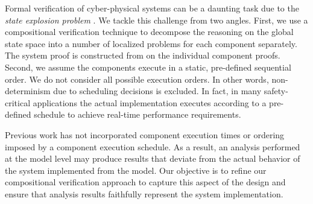 
Formal verification of cyber-physical systems can be a daunting task due to the \emph{state
explosion problem} \cite{Clarke2012}. We tackle this challenge from two angles. First, we use a
compositional verification technique to decompose the reasoning on the global state space into a
number of localized problems for each component separately. The system proof is constructed
from on the individual component proofs. Second, we assume the components execute in a static, pre-defined
sequential order. We do not consider all possible execution orders. In other words, non-determinism
due to scheduling decisions is excluded. In fact, in many safety-critical applications the actual
implementation executes according to a pre-defined schedule to achieve real-time performance
requirements.  

Previous work has not incorporated component execution times or ordering imposed by 
a component execution schedule. As a result, an analysis performed at the model level 
may produce results that deviate from the actual behavior of the system implemented 
from the model.  Our objective is to refine our compositional verification approach to capture 
this aspect of the design and ensure that analysis results faithfully represent the system 
implementation.  

